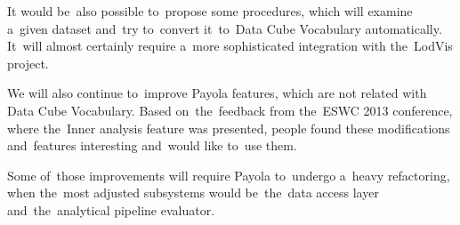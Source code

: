 It would be~also possible to~propose some procedures, which will examine a~given 
dataset and~try to~convert it~to~Data Cube Vocabulary automatically. It~will 
almost certainly require a~more sophisticated integration with the~LodVis 
project.

We will also continue to~improve Payola features, which are not related with 
Data Cube Vocabulary. Based on~the~feedback from the~ESWC 2013 conference, where the~Inner analysis feature was presented, people found these modifications and~features interesting and~would like to~use them.

Some of~those improvements will require Payola to~undergo a~heavy refactoring, 
when the~most adjusted subsystems would be~the~data access layer and~the~analytical 
pipeline evaluator.

